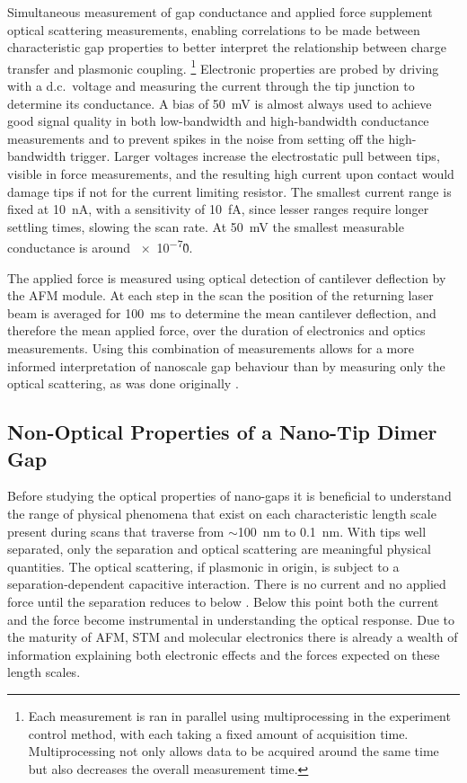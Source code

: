 \documentclass[a4paper]{article}
\begin{document}
Simultaneous measurement of gap conductance and applied force supplement optical scattering measurements, enabling correlations to be made between characteristic gap properties to better interpret the relationship between charge transfer and plasmonic coupling.%
\footnote{Each measurement is ran in parallel using multiprocessing in the experiment control method, with each taking a fixed amount of acquisition time. Multiprocessing not only allows data to be acquired around the same time but also decreases the overall measurement time.}
Electronic properties are probed by driving with a d.c.\ voltage and measuring the current through the tip junction to determine its conductance. A bias of \SI{50}{mV} is almost always used to achieve good signal quality in both low-bandwidth and high-bandwidth conductance measurements and to prevent spikes in the noise from setting off the high-bandwidth trigger. Larger voltages increase the electrostatic pull between tips, visible in force measurements, and the resulting high current upon contact would damage tips if not for the current limiting resistor. The smallest current range is fixed at \SI{10}{nA}, with a sensitivity of \SI{10}{fA}, since lesser ranges require longer settling times, slowing the scan rate. At \SI{50}{mV} the smallest measurable conductance is around \num{e-7}\G0.

The applied force is measured using optical detection of cantilever deflection by the AFM module. At each step in the scan the position of the returning laser beam is averaged for \SI{100}{ms} to determine the mean cantilever deflection, and therefore the mean applied force, over the duration of electronics and optics measurements.
Using this combination of measurements allows for a more informed interpretation of nanoscale gap behaviour than by measuring only the optical scattering, as was done originally \cite{savage2012}.

\subsection{Non-Optical Properties of a Nano-Tip Dimer Gap}

Before studying the optical properties of nano-gaps it is beneficial to understand the range of physical phenomena that exist on each characteristic length scale present during scans that traverse from $\sim$\SI{100}{nm} to \SI{0.1}{nm}. With tips well separated, only the separation and optical scattering are meaningful physical quantities. The optical scattering, if plasmonic in origin, is subject to a separation-dependent capacitive interaction. There is no current and no applied force until the separation reduces to below . Below this point both the current and the force become instrumental in understanding the optical response. Due to the maturity of AFM, STM and molecular electronics there is already a wealth of information explaining both electronic effects and the forces expected on these length scales.
\end{document}
